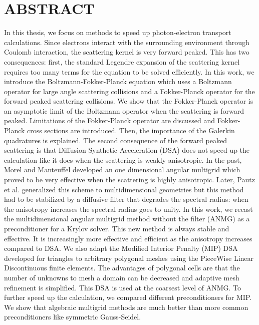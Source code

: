 \chapter*{ABSTRACT}
\pagestyle{plain}
\setcounter{page}{2}
\indent In this thesis, we focus on methods to speed up photon-electron transport
calculations. Since electrons interact with the surrounding environment 
through Coulomb interaction, the scattering kernel is very forward peaked. 
This has two consequences: first, the standard Legendre expansion of the 
scattering kernel requires too many terms for the equation to be solved 
efficiently. In this work, we introduce the Boltzmann-Fokker-Planck 
equation which uses a Boltzmann operator for large angle scattering 
collisions and a Fokker-Planck operator for the forward peaked scattering 
collisions. We show that the Fokker-Planck operator is an asymptotic 
limit of the Boltzmann operator when the scattering is forward peaked. 
Limitations of the Fokker-Planck operator are discussed and Fokker-Planck 
cross sections are introduced. Then, the importance of the Galerkin 
quadratures is explained. The second consequence of the forward peaked 
scattering is that Diffusion Synthetic Acceleration (DSA) does not speed 
up the calculation like it does when the scattering is weakly anisotropic. 
In the past, Morel and Manteuffel developed an one dimensional angular 
multigrid which proved to be very effective when the scattering is 
highly anisotropic. Later, Pautz et al. generalized this scheme to 
multidimensional geometries but this method had to be stabilized by 
a diffusive filter that degrades the spectral radius: when the anisotropy 
increases the spectral radius goes to unity. In this work, we recast the 
multidimensional angular multigrid method without the filter (ANMG) as 
a preconditioner for a Krylov solver. This new method is always stable 
and effective. It is increasingly more effective and efficient as the 
anisotropy increases compared to DSA. We also adapt the Modified Interior 
Penalty (MIP) DSA developed for triangles to arbitrary polygonal meshes 
using the PieceWise Linear Discontinuous finite elements. The advantages 
of polygonal cells are that the number of unknowns to mesh a domain can 
be decreased and adaptive mesh refinement is simplified. This DSA is used 
at the coarsest level of ANMG. To further speed up the calculation, we 
compared different preconditioners for MIP. We show that algebraic multigrid 
methods are much better than more common preconditioners like symmetric
Gauss-Seidel.
\pagebreak{}
